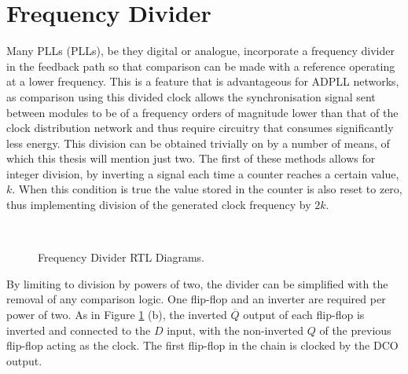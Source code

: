 \section{Frequency Divider}
Many \aclp{PLL} (\acsp{PLL}), be they digital or analogue, incorporate a frequency divider in the feedback path so that comparison can be made with a reference operating at a lower frequency. This is a feature that is advantageous for \ac{ADPLL} networks, as comparison using this divided clock allows the synchronisation signal sent between modules to be of a frequency orders of magnitude lower than that of the clock distribution network and thus require circuitry that consumes significantly less energy. This division can be obtained trivially on  by a number of means, of which this thesis will mention just two. The first of these methods allows for integer division, by inverting a signal each time a counter reaches a certain value, $k$. When this condition is true the value stored in the counter is also reset to zero, thus implementing division of the generated clock frequency by $2k$.
\begin{figure}[h]%
	\centering
	\\
	\caption[Frequency Divider \ac{RTL} Diagrams]{Frequency Divider \ac{RTL} Diagrams.}
	\label{fig:divs}
\end{figure}
By limiting to division by powers of two, the divider can be simplified with the removal of any comparison logic. One flip-flop and an inverter are required per power of two. As in Figure \ref{fig:divs} (b), the inverted $\overline{Q}$ output of each flip-flop is inverted and connected to the $D$ input, with the non-inverted $Q$ of the previous flip-flop acting as the clock. The first flip-flop in the chain is clocked by the \ac{DCO} output. 

